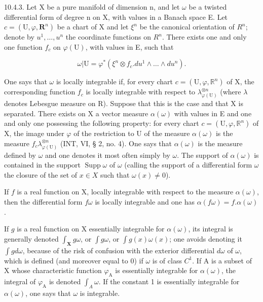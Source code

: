 10.4.3. Let X be a pure manifold of dimension n, and let \(\omega\) be a twisted differential form of degree n on X, with values in a Banach space E. Let \(c = (\mathrm{U}, \varphi, \mathbf{R}^{n})\) be a chart of X and let \(\xi^{n}\) be the canonical orientation of \(R^{n}\); denote by \(u^{1}, \ldots, u^{n}\) the coordinate functions on \(R^{n}\). There exists one and only one function \(f_{c}\) on \(\varphi(\mathrm{U})\), with values in E, such that

\[
\omega | \mathrm{U} = \varphi^ {*} (\xi^ {n} \otimes f _ {c}. d u ^ {1} \wedge \dots \wedge d u ^ {n}).
\]

One says that \(\omega\) is locally integrable if, for every chart \(c = (\mathrm{U},\varphi ,\mathbb{R}^n)\) of X, the corresponding function \(f_{c}\) is locally integrable with respect to \(\lambda_{\varphi (\mathrm{U})}^{\otimes n}\) (where \(\lambda\) denotes Lebesgue measure on R). Suppose that this is the case and that X is separated. There exists on X a vector measure \(\alpha (\omega)\) with values in E and one and only one possessing the following property: for every chart \(c = (\mathrm{U},\varphi ,\mathbb{R}^n)\) of X, the image under \(\varphi\) of the restriction to U of the measure \(\alpha (\omega)\) is the measure \(f_{c}\lambda_{\varphi(\mathrm{U})}^{\otimes n}\) (INT, VI, § 2, no. 4). One says that \(\alpha (\omega)\) is the measure defined by \(\omega\) and one denotes it most often simply by \(\omega\). The support of \(\alpha (\omega)\) is contained in the support \(\operatorname{Supp}\omega\) of \(\omega\) (calling the support of a differential form \(\omega\) the closure of the set of \(x\in X\) such that \(\omega (x)\neq 0\)).

If \(f\) is a real function on X, locally integrable with respect to the measure \(\alpha(\omega)\), then the differential form \(f\omega\) is locally integrable and one has \(\alpha(f\omega) = f.\alpha(\omega)\).

If \(g\) is a real function on X essentially integrable for \(\alpha(\omega)\), its integral is generally denoted \(\int_{\mathbf{X}} g\omega\), or \(\int g\omega\), or \(\int g(x)\omega(x)\); one avoids denoting it \(\int g d\omega\), because of the risk of confusion with the exterior differential \(d\omega\) of \(\omega\), which is defined (and moreover equal to 0) if \(\omega\) is of class \(C^{1}\). If A is a subset of X whose characteristic function \(\varphi_{\mathrm{A}}\) is essentially integrable for \(\alpha(\omega)\), the integral of \(\varphi_{\mathrm{A}}\) is denoted \(\int_{A} \omega\). If the constant 1 is essentially integrable for \(\alpha(\omega)\), one says that \(\omega\) is integrable.


